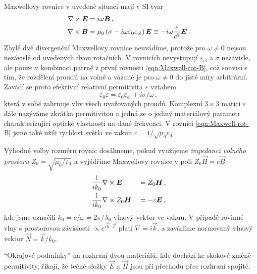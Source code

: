 Maxwellovy rovnice v uvedené situaci mají v SI tvar
\begin{align}
    \nabla\times \bm{E}&=i\omega\bm{B} \,, \label{eqn:Maxwell-rot-E} \\
    \nabla\times \bm{B}&=\mu_0 \left( \sigma - i\omega \varepsilon_0 \varepsilon_{\textrm{el}} \right) \bm{E} 
        \equiv -i\omega\frac{\varepsilon}{c^2} \bm{E} \,. \label{eqn:Maxwell-rot-B}
\end{align}
Zbylé dvě divergenční Maxwellovy rovnice neuvádíme, protože pro $\omega\neq 0$ nejsou nezávislé od uvedených dvou rotačních.
V rovnicích nevystupují $\varepsilon_{\textrm{el}}$ a $\sigma$ nezávisle, ale pouze v kombinaci patrné z první rovnosti \eqref{eqn:Maxwell-rot-B}, což souvisí s tím, že rozdělení proudů na volné a vázané je pro $\omega\neq 0$ do jisté míry arbitrární.
Zavádí se proto efektivní relativní permitivita $\varepsilon$ vztahem
\begin{equation}
    \varepsilon_0 \varepsilon=\varepsilon_0 \varepsilon_{\textrm{el}}+i\sigma/\omega \,,
\end{equation}
která v sobě zahrnuje vliv všech uvažovaných proudů.
Komplexní $3\times 3$ matici $\varepsilon$ dále nazýváme zkrátka permitivitou a jedná se o jediný materiálový parametr charakterizující optické vlastnosti na dané frekvenci.
V rovnici \eqref{eqn:Maxwell-rot-B} jsme také užili rychlost světla ve vakuu $c=1/\sqrt{\mu_0 \varepsilon_0}$.

Výhodné volby rozměru rovnic dosáhneme, pokud využijeme \emph{impedanci volného prostoru} $Z_0 = \sqrt{\mu_0/\varepsilon_0}$ a vyjádříme Maxwellovy rovnice v poli $Z_0 \vec{H}=c \vec{B}$
\begin{alignat}{2}
    & \frac{1}{ik_0} \nabla\times \bm{E} &&= Z_0 \bm{H} \,, \label{eqn:rot-E}\\
    & \frac{1}{ik_0}  \nabla\times Z_0 \bm{H} &&=-\varepsilon \bm{E} \,, \label{eqn:rot-ZH}
\end{alignat}
kde jsme označili $k_0 = c/\omega = 2\pi/\lambda_0$ vlnový vektor ve vakuu.
V případě rovinné vlny s prostorovou závislostí $\propto e^{i \vec{k}\cdot \vec{r}}$ platí $\nabla = i\vec{k}$, a zavádíme normovaný vlnový vektor $\vec{N}=\vec{k}/k_0$.

``Okrajové podmínky'' na rozhraní dvou materiálů, kde dochází ke skokové změně permitivity, říkají, že tečné složky $\vec{E}$ a $\vec{H}$ jsou při přechodu přes rozhraní spojité\cite{bornPrinciplesOpticsElectromagnetic1999}.
